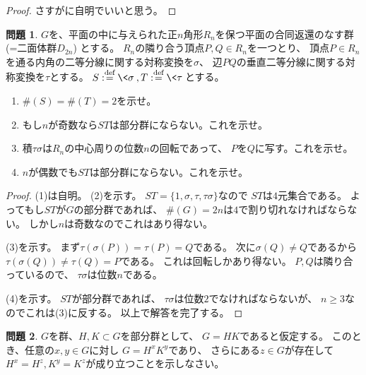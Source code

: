 \documentclass[uplatex]{jsreport}
\theoremstyle{definition}
\newtheorem{prob}[prob]{問題}
\newcommand{\dfn}{:\overset{\mbox{{\scriptsize def}}}{=}}
\begin{document}
\begin{proof}
  さすがに自明でいいと思う。
\end{proof}





\begin{prob}
  \(G\)を、平面の中に与えられた正\(n\)角形\(R_n\)を保つ平面の合同返還のなす群
  (=二面体群\(D_{2n}\)) とする。
  \(R_n\)の隣り合う頂点\(P,Q\in R_n\)を一つとり、
  頂点\(P\in R_n\)を通る内角の二等分線に関する対称変換を\(\sigma\)、
  辺\(PQ\)の垂直二等分線に関する対称変換を\(\tau\)とする。
  \(S\dfn \<\sigma\>, T\dfn \<\tau\>\)とする。
  \begin{enumerate}
    \item \(\#(S) = \#(T) = 2\)を示せ。
    \item もし\(n\)が奇数なら\(ST\)は部分群にならない。これを示せ。
    \item 積\(\tau\sigma\)は\(R_n\)の中心周りの位数\(n\)の回転であって、
    \(P\)を\(Q\)に写す。これを示せ。
    \item \(n\)が偶数でも\(ST\)は部分群にならない。これを示せ。
  \end{enumerate}
\end{prob}

\begin{proof}
  (1)は自明。
  (2)を示す。
  \(ST = \{1,\sigma,\tau,\tau\sigma\}\)なので
  \(ST\)は\(4\)元集合である。
  よってもし\(ST\)が\(G\)の部分群であれば、
  \(\#(G) = 2n\)は\(4\)で割り切れなければならない。
  しかし\(n\)は奇数なのでこれはあり得ない。

  (3)を示す。
  まず\(\tau(\sigma(P)) = \tau(P) = Q\)である。
  次に\(\sigma(Q)\neq Q\)であるから\(\tau(\sigma(Q)) \neq \tau(Q) = P\)である。
  これは回転しかあり得ない。
  \(P,Q\)は隣り合っているので、
  \(\tau\sigma\)は位数\(n\)である。

  (4)を示す。
  \(ST\)が部分群であれば、
  \(\tau\sigma\)は位数\(2\)でなければならないが、
  \(n\geq 3\)なのでこれは(3)に反する。
  以上で解答を完了する。
\end{proof}




\begin{prob}
  \(G\)を群、\(H,K\subset G\)を部分群として、
  \(G = HK\)であると仮定する。
  このとき、任意の\(x,y\in G\)に対し
  \(G = H^xK^y\)であり、
  さらにある\(z\in G\)が存在して
  \(H^x = H^z, K^y = K^z\)が成り立つことを示しなさい。
\end{prob}
\end{document}
